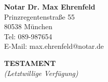 \documentclass[a4paper, 12pt]{article}
\begin{document}
\vspace*{-2.5cm}

\noindent
\begin{minipage}{0.6\textwidth}
    \large\textbf{Notar Dr. Max Ehrenfeld}\\
    \normalsize
    Prinzregentenstraße 55\\
    80538 München\\
    Tel: 089-987654\\
    E-Mail: max.ehrenfeld@notar.de
\end{minipage}
\begin{minipage}{0.4\textwidth}
    \flushright
\end{minipage}

\vspace{-1cm}

\begin{center}
    \Large\textbf{TESTAMENT}\\
    \vspace{0.3cm}
    \normalsize\textit{(Letztwillige Verfügung)}
\end{center}

\vspace{0cm}
\end{document}
